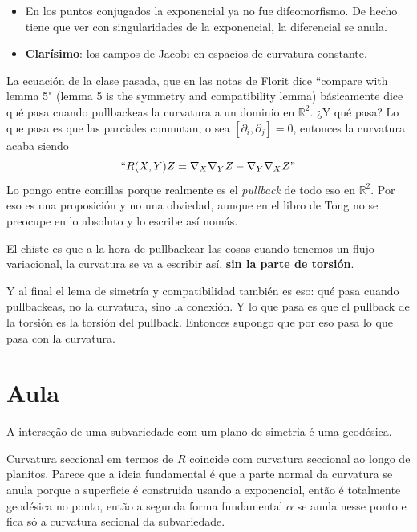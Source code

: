 \begin{itemize}
\item En los puntos conjugados la exponencial ya no fue difeomorfismo. De hecho tiene que ver con singularidades de la exponencial, la diferencial se anula.
\item \textbf{Clarísimo}: los campos de Jacobi en espacios de curvatura constante.
\end{itemize}

\begin{remark}\leavevmode
	La ecuación de la clase pasada, que en las notas de Florit dice ``compare with lemma 5" (lemma 5 is the symmetry and compatibility lemma) básicamente dice qué pasa cuando pullbackeas la curvatura a un dominio en \(\mathbb{R}^2\). ¿Y qué pasa? Lo que pasa es que las parciales conmutan, o sea \([\partial_i,\partial_j]=0\), entonces la curvatura acaba siendo
	\[``R(X,Y)Z=\nabla_X \nabla_Y Z-\nabla_Y \nabla_X Z"\]
	Lo pongo entre comillas porque realmente es el \textit{pullback} de todo eso en \(\mathbb{R}^2\). Por eso es una proposición y no una obviedad, aunque en el libro de Tong no se preocupe en lo absoluto y lo escribe así nomás.

	El chiste es que a la hora de pullbackear las cosas cuando tenemos un flujo variacional, la curvatura se va a escribir así, \textbf{sin la parte de torsión}.

	Y al final el lema de simetría y compatibilidad también es eso: qué pasa cuando pullbackeas, no la curvatura, sino la conexión. Y lo que pasa es que el pullback de la torsión es la torsión del pullback. Entonces supongo que por eso pasa lo que pasa con la curvatura.
\end{remark}


\section{Aula}

\begin{exercise}\leavevmode
A interseção de uma subvariedade com um plano de simetria é uma geodésica.
\end{exercise}

\begin{thm}\leavevmode
Curvatura seccional em termos de \(R\) coincide com curvatura seccional ao longo de planitos. Parece que a ideia fundamental é que a parte normal da curvatura se anula porque a superficie é construida usando a exponencial, então é totalmente geodésica no ponto, então a segunda forma fundamental \(\alpha\) se anula nesse ponto e fica só a curvatura secional da subvariedade.
\end{thm}

